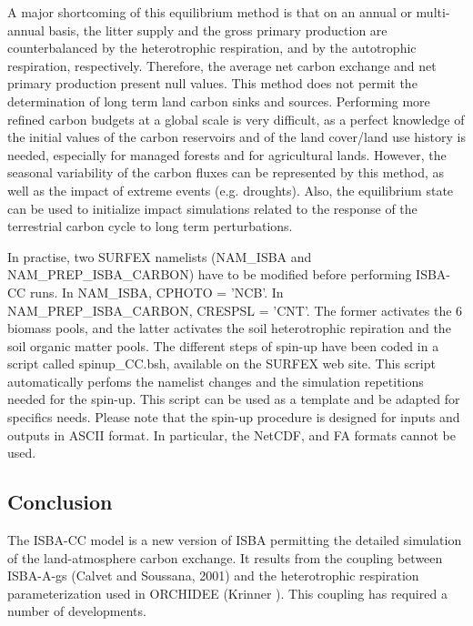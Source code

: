 {A major shortcoming of this equilibrium method is that on an annual or multi-annual basis, the 
litter supply and the gross primary production are counterbalanced by the heterotrophic respiration, 
and by the autotrophic respiration, respectively.
Therefore, the average net carbon exchange and net primary production present null values.
This method does not permit the determination of long term land carbon sinks and sources. 
Performing more refined carbon budgets at a global scale is very difficult, as a perfect knowledge 
of the initial values of the carbon reservoirs and of the land cover/land use history is needed, 
especially for managed forests and for agricultural lands.
However, the seasonal variability of the carbon fluxes can be represented by this method, as well 
as the impact of extreme events (e.g. droughts).
Also, the equilibrium state can be used to initialize impact simulations related to the response of 
the terrestrial carbon cycle to long term perturbations.

In practise, two SURFEX namelists (NAM\_ISBA and NAM\_PREP\_ISBA\_CARBON) have to be modified before performing ISBA-CC runs.
In NAM\_ISBA, CPHOTO = 'NCB'. In NAM\_PREP\_ISBA\_CARBON, CRESPSL = 'CNT'. The former activates the 6 biomass pools, and the latter activates 
the soil heterotrophic repiration and the soil organic matter pools.
The different steps of spin-up have been coded in a script called spinup\_CC.bsh, 
available on the SURFEX web site. This script automatically perfoms the namelist
changes and the simulation repetitions needed for the spin-up. This script can be
used as a template and be adapted for specifics needs. Please note that the spin-up
procedure is designed for inputs and outputs in ASCII format. In particular, the
NetCDF, and FA formats cannot be used.



\subsection{Conclusion}

The ISBA-CC model is a new version of ISBA permitting 
the detailed simulation of the land-atmosphere carbon exchange. 
It results from the coupling between ISBA-A-gs (Calvet and Soussana, 2001) 
and the heterotrophic respiration parameterization used in ORCHIDEE (Krinner ).
This coupling has required a number of developments.

}

